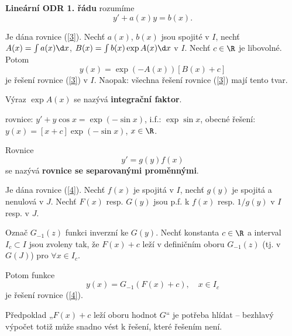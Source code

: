 \begin{definice}
\textbf{Lineární ODR 1. řádu} rozumíme
\begin{equation}\label{3}
y' + a(x)y = b(x).
\end{equation}
\end{definice}

\begin{veta}
Je dána rovnice (\ref{3}). Nechť $a(x)$, $b(x)$ jsou spojité v $I$, nechť $A(x) = \int a(x) \d x$, $B(x) = \int b(x) \exp A(x) \d x$ v $I$. Nechť $c \in \R$ je libovolné. Potom
\[
y(x) = \exp(-A(x))[B(x) + c]
\]
je řešení rovnice (\ref{3}) v $I$. Naopak: všechna řešení rovnice (\ref{3}) mají tento tvar.
\end{veta}

\begin{poznamka}
Výraz $\exp A(x)$ se nazývá \textbf{integrační faktor}.
\end{poznamka}

\begin{priklad}
rovnice: $y' + y \cos x = \exp(-\sin x)$, i.f.: $\exp \sin x$, obecné řešení: $y(x) = [x + c] \exp(-\sin x)$, $x \in \R$.
\end{priklad}

\begin{definice}
Rovnice
\begin{equation}\label{4}
y' = g(y)f(x)
\end{equation}
se nazývá \textbf{rovnice se separovanými proměnnými}.
\end{definice}

\begin{veta}
Je dána rovnice (\ref{4}). Nechť $f(x)$ je spojitá v $I$, nechť $g(y)$ je spojitá a nenulová v $J$. Nechť $F(x)$ resp. $G(y)$ jsou p.f. k $f(x)$ resp. $1/g(y)$ v $I$ resp. v $J$.

Označ $G_{-1}(z)$ funkci inverzní ke $G(y)$. Nechť konstanta $c \in \R$ a interval $I_c \subset I$ jsou zvoleny tak, že $F(x) + c$ leží v definičním oboru $G_{-1}(z)$ (tj. v $G(J)$) pro $\forall x \in I_c$.

Potom funkce
\[
y(x) = G_{-1}(F(x) + c), \quad x \in I_c
\]
je řešení rovnice (\ref{4}).
\end{veta}

\begin{poznamka}
Předpoklad „$F(x)+c$ leží oboru hodnot $G$“ je potřeba hlídat – bezhlavý výpočet totiž může snadno vést k řešení, které řešením není.
\end{poznamka}

